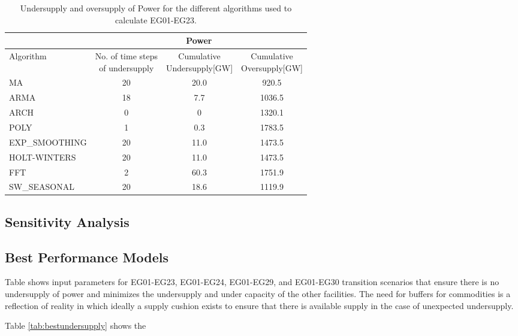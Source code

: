 \begin{table*}[!h]
	\centering
	\caption {Undersupply and oversupply of Power for the different algorithms used to calculate EG01-EG23.}
	\label{tab:23-power}
	\begin{tabular}{|l|c|c|c|}
		\hline
		& \multicolumn{3}{c|}{Power} \\ \hline
		Algorithm & \shortstack{No. of time steps\\of undersupply}  & 
		\shortstack{Cumulative\\Undersupply[GW]}  & \shortstack{Cumulative\\Oversupply[GW]} \\ \hline
		MA        & 20 	& 20.0  &  920.5   \\ \hline
		ARMA      & 18 	&  7.7  &  1036.5  \\ \hline
		ARCH      &  0 	&   0  	&  1320.1  \\ \hline
		POLY      &  1 	&  0.3 	&  1783.5  \\ \hline
		EXP\_SMOOTHING 	& 20 	& 11.0 & 1473.5 \\ \hline
		HOLT-WINTERS  	& 20 	& 11.0 & 1473.5 \\ \hline
		FFT       & 2 	& 60.3 	& 1751.9 	\\ \hline
		SW\_SEASONAL    & 20 	& 18.6 	& 1119.9 	\\ \hline
	\end{tabular}
\end{table*}

\subsection{Sensitivity Analysis}

\subsection{Best Performance Models}
Table %
shows \deploy input parameters for
EG01-EG23, EG01-EG24, EG01-EG29, and EG01-EG30 transition scenarios
that ensure there is no undersupply of power and minimizes 
the undersupply and under capacity of the other facilities. 
The need for buffers for commodities is a reflection of reality
in which ideally a supply cushion exists to ensure that there 
is available supply in the case of unexpected undersupply. 

Table \ref{tab:bestundersupply} shows the

